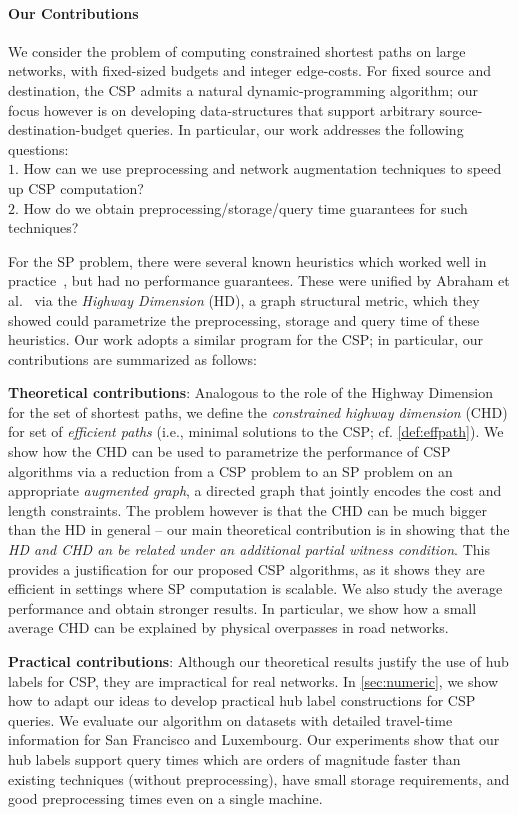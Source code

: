 \paragraph{Our Contributions}
We consider the problem of computing constrained shortest paths on large networks, with fixed-sized budgets and integer edge-costs. For fixed source and destination, the CSP admits a natural dynamic-programming algorithm; our focus however is on developing data-structures that support arbitrary source-destination-budget queries. In particular, our work addresses the following questions:\\
\noindent $1.$ How can we use preprocessing and network augmentation techniques to speed up CSP computation? \\
\noindent $2.$ How do we obtain preprocessing/storage/query time guarantees for such techniques?

For the SP problem, there were several known heuristics which worked well in practice~\cite{dimacs09}, but had no performance guarantees.
These were unified by Abraham et al.~\cite{highway2013, highway2010} via the \emph{Highway Dimension} (HD), a graph structural metric, which they showed could parametrize the preprocessing, storage and query time of these heuristics.
Our work adopts a similar program for the CSP; in particular, our contributions are summarized as follows:

\noindent\textbf{Theoretical contributions}: 
Analogous to the role of the Highway Dimension for the set of shortest paths, we define the \emph{constrained highway dimension} (CHD) for set of {\em efficient paths} (i.e., minimal solutions to the CSP; cf. \ref{def:effpath}). We show how the CHD can be used to parametrize the performance of CSP algorithms via a reduction from a CSP problem to an SP problem on an appropriate \emph{augmented graph}, a directed graph that jointly encodes the cost and length constraints. The problem however is that the CHD can be much bigger than the HD in general -- our main theoretical contribution is in showing that the \emph{HD and CHD an be related under an additional partial witness condition}. 
This provides a justification for our proposed CSP algorithms, as it shows they are efficient in settings where SP computation is scalable. We also study the  average performance and obtain stronger results. 
In particular, we show how a small average CHD can be explained by physical overpasses in road networks.

\noindent\textbf{Practical contributions}: 
Although our theoretical results justify the use of hub labels for CSP, they are impractical for real networks. 
In \cref{sec:numeric}, we show how to adapt our ideas to develop practical hub label constructions for CSP queries. 
We evaluate our algorithm on datasets with detailed travel-time information for San Francisco and Luxembourg.
Our experiments show that our hub labels support query times which are orders of magnitude faster than existing techniques (without preprocessing), have small storage requirements, and good preprocessing times even on a single machine. 

